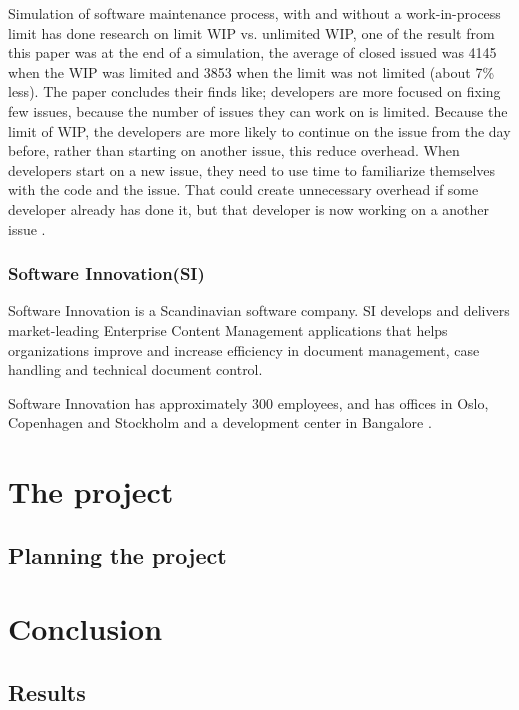 \documentclass[UKenglish]{ifimaster}  %
\begin{document}
Simulation of software maintenance process, with and without a work-in-process limit has done research on limit WIP vs. unlimited WIP, one of the result from this paper was at the end of a simulation, the average of closed issued was 4145 when the WIP was limited and 3853 when the limit was not limited (about 7\% less). The paper concludes their finds like; developers are more focused on fixing few issues, because the number of issues they can work on is limited.  Because the limit of WIP, the developers are more likely to continue on the issue from the day before, rather than starting on another issue, this reduce overhead. When developers start on a new issue, they need to use time to familiarize themselves with the code and the issue. That could create unnecessary overhead if some developer already has done it, but that developer is now working on a another issue \parencite{SMR:SMR1599}.

\section{Software Innovation(SI)}
Software Innovation is a Scandinavian software company. SI develops and delivers market-leading Enterprise Content Management applications that helps organizations improve and increase efficiency in document management, case handling and technical document control.

Software Innovation has approximately 300 employees, and has offices in Oslo, Copenhagen and Stockholm and a development center in Bangalore \parencite{SI}.


\part{The project}                    %

\chapter{Planning the project}        %


\part{Conclusion}                     %

\chapter{Results}                     %


\backmatter{}
\printbibliography
\end{document}
